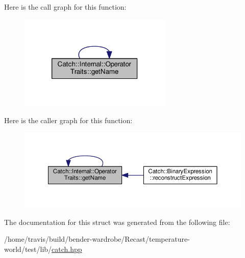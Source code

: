 Here is the call graph for this function\-:
\nopagebreak
\begin{figure}[H]
\begin{center}
\leavevmode
\includegraphics[width=206pt]{struct_catch_1_1_internal_1_1_operator_traits_ac6d08082ea33348d42bc4ccbd6d07671_cgraph}
\end{center}
\end{figure}




Here is the caller graph for this function\-:
\nopagebreak
\begin{figure}[H]
\begin{center}
\leavevmode
\includegraphics[width=350pt]{struct_catch_1_1_internal_1_1_operator_traits_ac6d08082ea33348d42bc4ccbd6d07671_icgraph}
\end{center}
\end{figure}




The documentation for this struct was generated from the following file\-:\begin{DoxyCompactItemize}
\item 
/home/travis/build/bender-\/wardrobe/\-Recast/temperature-\/world/test/lib/\hyperlink{catch_8hpp}{catch.\-hpp}\end{DoxyCompactItemize}
